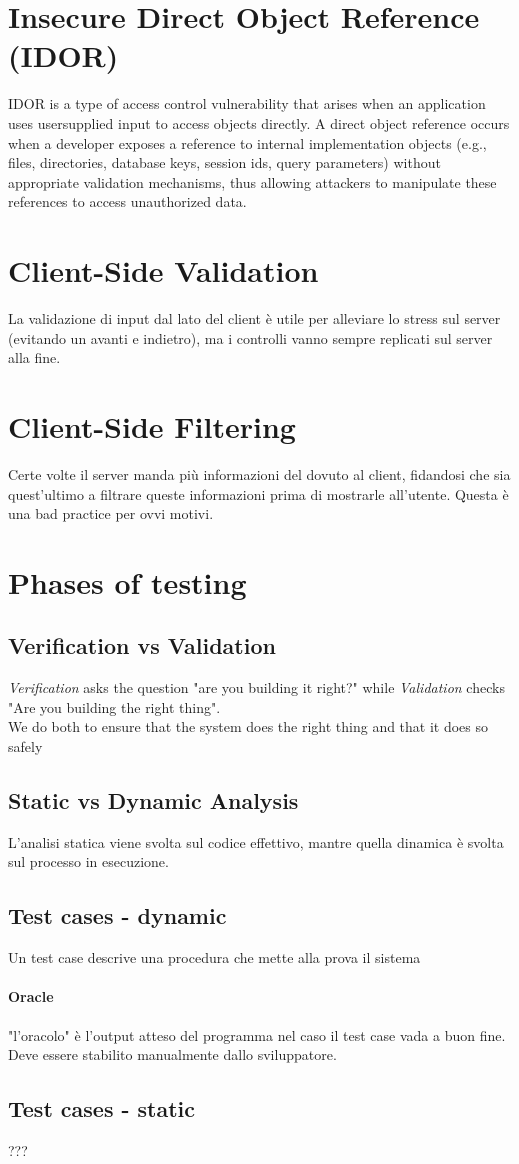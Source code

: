 \documentclass{article}
\begin{document}
\section{Insecure Direct Object Reference (IDOR)}
IDOR is a type of access control vulnerability that arises when an application uses usersupplied input to access objects directly.
A direct object reference occurs when a developer exposes a reference to internal
implementation objects (e.g., files, directories, database keys, session ids, query
parameters) without appropriate validation mechanisms, thus allowing attackers to
manipulate these references to access unauthorized data.

\section{Client-Side Validation}
La validazione di input dal lato del client è utile per alleviare lo stress sul server (evitando un avanti e indietro), ma i controlli vanno sempre replicati sul server alla fine.

\section{Client-Side Filtering}
Certe volte il server manda più informazioni del dovuto al client, fidandosi che sia quest'ultimo a filtrare queste informazioni prima di mostrarle all'utente. Questa è una bad practice per ovvi motivi.

\section{Phases of testing}
\subsection{Verification vs Validation}
\textit{Verification} asks the question "are you building it right?" while \textit{Validation} checks "Are you building the right thing".\\
We do both to ensure that the system does the right thing and that it does so safely

\subsection{Static vs Dynamic Analysis}
L'analisi statica viene svolta sul codice effettivo, mantre quella dinamica è svolta sul processo in esecuzione.

\subsection{Test cases - dynamic}
Un test case descrive una procedura che mette alla prova il sistema
\paragraph{Oracle} "l'oracolo" è l'output atteso del programma nel caso il test case vada a buon fine. Deve essere stabilito manualmente dallo sviluppatore.

\subsection{Test cases - static}
???
\end{document}
